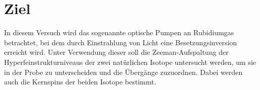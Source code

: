 \section{Ziel}
  In diesem Versuch wird das sogenannte optische Pumpen an Rubidiumgas betrachtet, bei dem durch Einstrahlung von Licht eine Besetzungsinversion erreicht wird.
  Unter Verwendung dieser soll die Zeeman-Aufspaltung der Hyperfeinstrukturniveaus der zwei natürlichen Isotope untersucht werden, um sie in der Probe zu unterscheiden und die Übergänge zuzuordnen.
  Dabei werden auch die Kernspins der beiden Isotope bestimmt.
\label{sec:Ziel}
